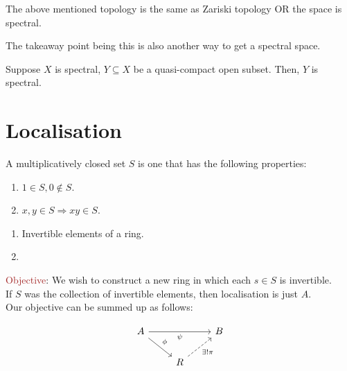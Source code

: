 \documentclass[oneside, 12pt, ]{scrbook}
\theoremstyle{theorem}
\begin{document}
\begin{proposition}
The above mentioned topology is the same as Zariski topology OR the space is spectral.
\end{proposition}

\begin{remark}
The takeaway point being this is also another way to get a spectral space.
\end{remark}

\begin{exercise}
Suppose $X$ is spectral, $Y\subseteq X$ be a quasi-compact open subset. Then, $Y$ is spectral.
\end{exercise}

\section{Localisation}

\begin{definition}
A multiplicatively closed set $S$ is one that has the following properties:
\begin{enumerate}
\item $1 \in S, 0 \not \in S$.
\item $x,y \in S \Rightarrow xy \in S$.
\end{enumerate}
\end{definition}

\begin{example}
\begin{enumerate}
\item Invertible elements of a ring.
\item 
\end{enumerate}
\end{example}

\textcolor{Brown}{Objective}: We wish to construct a new ring in which each $s\in S$ is invertible. \\

If $S$ was the collection of invertible elements, then localisation is just $A$. \\

Our objective can be summed up as follows: 

\[\begin{tikzcd}
	A && B \\
	& R
	\arrow["\psi"', from=1-1, to=1-3]
	\arrow["\phi", from=1-1, to=2-2]
	\arrow["{\exists ! \pi}"', dashed, from=2-2, to=1-3]
\end{tikzcd}\]
\end{document}
